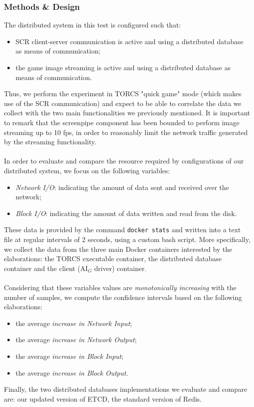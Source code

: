\subsubsection{Methods \& Design}
The distributed system in this test is configured such that:
\begin{itemize}
	\item SCR client-server communication is active and using a distributed database as means of communication;
	\item the game image streaming is active and using a distributed database as means of communication.
\end{itemize}
Thus, we perform the experiment in TORCS "quick game" mode (which makes use of the SCR communication) and  expect to be able to correlate the data we collect with the two main functionalities we previously mentioned. It is important to remark that the screenpipe component has been bounded to perform image streaming up to 10 fps, in order to reasonably limit the network traffic generated by the streaming functionality. \\ \\
In order to evaluate and compare the resource required by configurations of our distributed system, we focus on the following variables:
\begin{itemize}
	\item \textit{Network I/O}: indicating the amount of data sent and received over the network;
	\item \textit{Block I/O}: indicating the amount of data written and read from the disk.
\end{itemize}
These data is provided by the command \texttt{docker stats} and written into a text file at regular intervals of 2 seconds, using a custom bash script. More specifically, we collect the data from the three main Docker containers interested by the elaborations: the TORCS executable container, the distributed database container and the client (AI$_G$ driver) container. \\ \\
Considering that these variables values are \textit{monotonically increasing} with the number of samples, we compute the confidence intervals based on the following elaborations:
\begin{itemize}
	\item the average \textit{increase in Network Input};
	\item the average \textit{increase in Network Output};
	\item the average \textit{increase in Block Input};
	\item the average \textit{increase in Block Output}.
\end{itemize}
Finally, the two distributed databases implementations we evaluate and compare are: our updated version of ETCD, the standard version of Redis.

